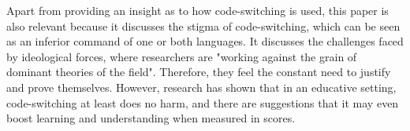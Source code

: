 \documentclass[12pt]{article}
\begin{document}
Apart from providing an insight as to how code-switching is used, this paper is also relevant because it discusses the stigma of code-switching, which can be seen as an inferior command of one or both languages. It discusses the challenges faced by ideological forces, where researchers are "working against the grain of dominant theories of the field". Therefore, they feel the constant need to justify and prove themselves. However, research has shown that in an educative setting, code-switching at least does no harm, and there are suggestions that it may even boost learning and understanding when measured in scores.

{}

\end{document}

